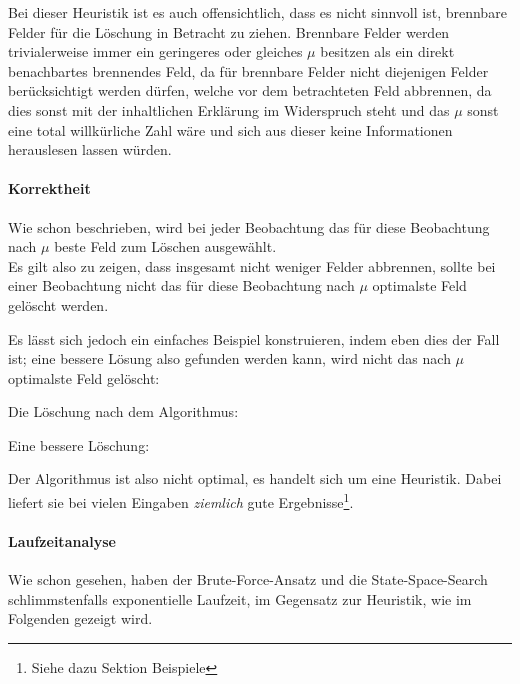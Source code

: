 Bei dieser Heuristik ist es auch offensichtlich, dass es nicht sinnvoll ist, brennbare Felder für die Löschung in Betracht zu ziehen. Brennbare Felder werden trivialerweise immer ein geringeres oder gleiches $\mu$ besitzen als ein direkt benachbartes brennendes Feld, da für brennbare Felder nicht diejenigen Felder berücksichtigt werden dürfen, welche vor dem betrachteten Feld abbrennen, da dies sonst mit der inhaltlichen Erklärung im Widerspruch steht und das $\mu$ sonst eine total willkürliche Zahl wäre und sich aus dieser keine Informationen herauslesen lassen würden.

\paragraph{Korrektheit}
Wie schon beschrieben, wird bei jeder Beobachtung das für diese Beobachtung nach $\mu$ beste Feld zum Löschen ausgewählt.\\
Es gilt also zu zeigen, dass insgesamt nicht weniger Felder abbrennen, sollte bei einer Beobachtung nicht das für diese Beobachtung nach $\mu$ optimalste Feld gelöscht werden. 

Es lässt sich jedoch ein einfaches Beispiel konstruieren, indem eben dies der Fall ist; eine bessere Lösung also gefunden werden kann, wird nicht das nach $\mu$ optimalste Feld gelöscht:

\newpage
\begin{multicols}{2}
Die Löschung nach dem Algorithmus:

{\ttfamily \small

}

Eine bessere Löschung:
{\ttfamily \small

}
\end{multicols}

Der Algorithmus ist also nicht optimal, es handelt sich um eine Heuristik. Dabei liefert sie bei vielen Eingaben \emph{ziemlich} gute Ergebnisse\footnote{Siehe dazu Sektion Beispiele}.

\paragraph{Laufzeitanalyse}
Wie schon gesehen, haben der Brute-Force-Ansatz und die State-Space-Search schlimmstenfalls exponentielle Laufzeit, im Gegensatz zur Heuristik, wie im Folgenden gezeigt wird.


